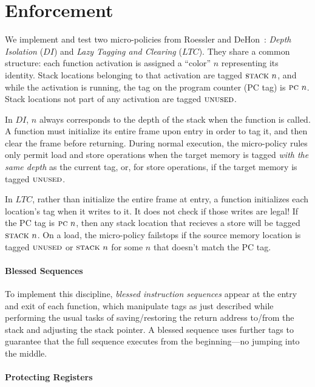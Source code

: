 \documentclass[10pt,conference]{ieeetran}%
\theoremstyle{definition}
\begin{document}
\section{Enforcement}
\label{sec:enforcement}

We implement and test two micro-policies from Roessler and DeHon~\cite{DBLP:conf/sp/RoesslerD18}:
{\em Depth Isolation} (\(DI\)) and {\em Lazy Tagging and Clearing} (\(LTC\)).
They share a common structure: each function activation is assigned a ``color'' \(n\)
representing its identity. Stack locations belonging to that activation are
tagged \(\textsc{stack} ~ n\), and while the activation is running, the tag on the
program counter (PC tag) is \(\textsc{pc} ~ n\). Stack locations not part of
any activation are tagged \(\textsc{unused}\).

In \(DI\), \(n\) always corresponds to the depth of the stack when
the function is called. A function must initialize its entire frame upon entry
in order to tag it, and then clear the frame before returning.
During normal execution, the micro-policy rules only permit load and
store operations when the target memory is tagged {\em with the same depth}
as the current {\PCname} tag, or, for store operations, if the target memory
is tagged \(\textsc{unused}\).

In \(LTC\), rather than initialize the entire frame at entry,
a function initializes each location's tag when it writes to it. It does
not check if those writes are legal! If the PC tag is \(\textsc{pc} ~ n\),
then any stack location that recieves a store will be tagged \(\textsc{stack} ~ n\).
On a load, the micro-policy failstops if the source memory location 
is tagged \(\textsc{unused}\) or \(\textsc{stack} ~ n\) for some \(n\) that
doesn't match the PC tag.

\paragraph*{Blessed Sequences}

To implement this discipline, {\em blessed instruction sequences} appear at
the entry and exit of each function, which manipulate tags as just described
while performing the usual tasks of saving/restoring the return address to/from
the stack and adjusting the stack pointer. A blessed sequence uses further tags
to guarantee that the full sequence executes from the beginning---no jumping into the middle.

\paragraph*{Protecting Registers}
\end{document}
